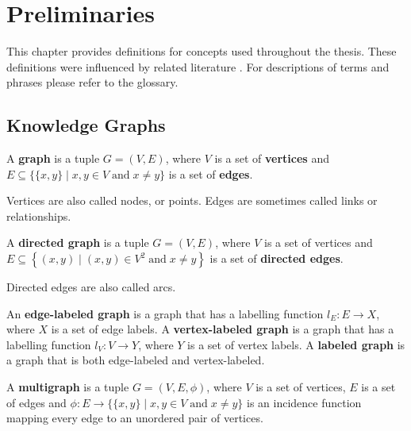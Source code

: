\chapter{Preliminaries} \label{ch:preliminaries}
This chapter provides definitions for concepts used throughout the thesis. These definitions were influenced by related literature \cite{Hogan2021KG, wikiGraph, acostaKG}. For descriptions of terms and phrases please refer to the glossary.


\section{Knowledge Graphs}

\begin{definition}[Graph]
    A \textbf{graph} is a tuple $G = (V, E)$, where $V$ is a set of \textbf{vertices} and $\displaystyle E\subseteq \{\{x,y\}\mid x,y\in V\;{\textrm {and}}\;x\neq y\}$ is a set of \textbf{edges}.

    Vertices are also called nodes, or points. Edges are sometimes called links or relationships.
\end{definition}

\begin{definition}
    A \textbf{directed graph} is a tuple $G = (V,E)$, where $V$ is a set of vertices and $\displaystyle E\subseteq \left\{(x,y)\mid (x,y)\in V^{2}\;{\textrm {and}}\;x\neq y\right\}$ is a set of \textbf{directed edges}.

    Directed edges are also called arcs.
\end{definition}

\begin{definition}
    An \textbf{edge-labeled graph} is a graph that has a labelling function $l_E : E \rightarrow X$, where $X$ is a set of edge labels.
    A \textbf{vertex-labeled graph} is a graph that has a labelling function $l_V : V \rightarrow Y$, where $Y$ is a set of vertex labels.
    A \textbf{labeled graph} is a graph that is both edge-labeled and vertex-labeled.
\end{definition}



\begin{definition}[Multigraph]
    A \textbf{multigraph} is a tuple $\displaystyle G=(V,E,\phi )$, where $V$ is a set of vertices, $E$ is a set of edges and $\displaystyle \phi :E\to \{\{x,y\}\mid x,y\in V\;{\textrm {and}}\;x\neq y\}$ is an incidence function mapping every edge to an unordered pair of vertices.
\end{definition}

